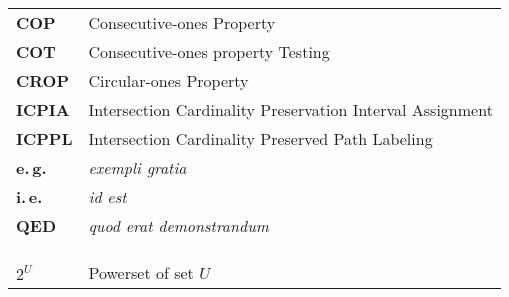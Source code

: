 \abbreviations

\begin{tabular}{ll}
  \textbf{COP}& Consecutive-ones Property \\
  \textbf{COT}& Consecutive-ones property Testing \\
  \textbf{CROP}& Circular-ones Property \\
  \textbf{ICPIA}& Intersection Cardinality Preservation Interval
  Assignment \\
  \textbf{ICPPL}& Intersection Cardinality Preserved Path Labeling \\ 
  \textbf{e.\,g.}& {\em exempli gratia} \\ 
  \textbf{i.\,e.}& {\em id est}\\
  \textbf{QED}& {\em quod erat demonstrandum}\\

  &\\
  \hline
  &\\
  &\\
  \textbf{$2^{U}$}  & Powerset of set $U$
\end{tabular}